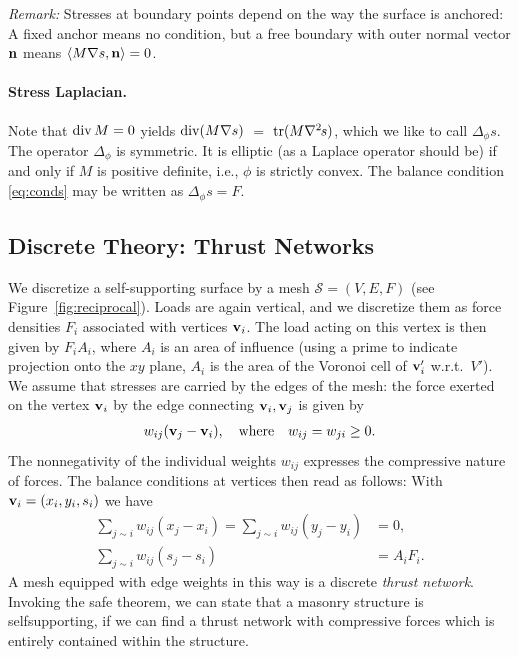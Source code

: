 \documentclass[review]{acmsiggraph}
\def\<{\mathchoice{\big\langle}{\langle}{\langle}{\langle}}
\def\>{\mathchoice{\big\rangle}{\rangle}{\rangle}{\rangle}}
\def\Div{\mathop{{\rm div}}\nolimits}
\def\tr{\mathop{{\rm tr}}\nolimits}
\def\ess{s}
\def\Hess#1{{\def\testess{#1}\nabla^2\ifx\testess\ess\!s\else #1\fi}}
\def\Hess#1{\text{$\nabla^2\hskip-.2ex #1$}}
\def\SS{{\mathcal S}}
\begin{document}
{\it Remark:} Stresses at boundary points depend on the way the surface is
anchored: A fixed anchor means no condition, but a free boundary with
outer normal vector ${\mathbf n}$ means $\<M \nabla s, \nw \> = 0$.


\paragraph{Stress Laplacian.} Note that $\Div M =0$ yields $\Div(M\nabla
s)$ $ =$ $ \tr(M\Hess s)$, which we like to call $\Delta_\phi s$. The
operator $\Delta_\phi$ is symmetric. It is elliptic (as a Laplace operator
should be) if and only if $M$ is positive definite, i.e., $\phi$ is
strictly convex. The balance condition \eqref{eq:conds} may be written as
	$
	\Delta_\phi s = F.
	$


\subsection{Discrete Theory: Thrust Networks}
\label{sec:thrustnetworks}

We discretize a self-supporting surface by a mesh $\SS=(V,E,F)$
(see Figure~\ref{fig:reciprocal}). Loads are again vertical,
and we discretize them as force densities $F_i$ associated with vertices
${\mathbf v}_i$. The load acting on this vertex is then given by $F_iA_i$, where
$A_i$ is an area of influence (using a prime to indicate projection onto
the $xy$ plane, $A_i$ is the area of the Voronoi cell of ${\mathbf v}_i'$ w.r.t.\
$V'$). We assume that stresses are carried by the edges of the mesh: the
force exerted on the vertex ${\mathbf v}_i$ by the edge connecting ${\mathbf v}_i,{\mathbf v}_j$
is given by
	\begin{align*}
	w_{ij} ({\mathbf v}_j-{\mathbf v}_i),
	\quad
	\text{where}\quad
	w_{ij}=w_{ji}\ge 0.
	\end{align*}
 The nonnegativity of the individual weights $w_{ij}$ expresses the
compressive nature of forces. The balance conditions at vertices then read
as follows: With ${\mathbf v}_i=(x_i,y_i,s_i)$ we have
	\begin{align}
	\sum\nolimits_{j\sim i}
		w_{ij} (x_j - x_i)
	=
	\sum\nolimits_{j\sim i}
		w_{ij} (y_j - y_i) &= 0,
			 \label{eq:deqtop} \\
	\sum\nolimits_{j\sim i}
		w_{ij} (s_j - s_i)
		&= A_i F_i.
			\label{eq:deqz}
	\end{align}
 A mesh equipped with edge weights in this way is a discrete \emph{thrust
network}. Invoking the safe theorem, we can state that a masonry structure
is self\dash supporting, if we can find a thrust network with compressive
forces which is entirely contained within the structure.
\end{document}
